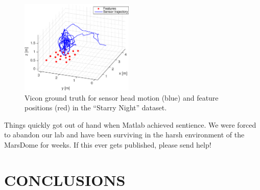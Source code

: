 \documentclass[letterpaper, 10 pt, conference]{ieeeconf}  %
\begin{document}
\begin{figure}
    \centering
    \includegraphics[width=0.48\textwidth]{figs/trajectory_groundtruth}
    \caption{Vicon ground truth for sensor head motion (blue) and feature positions (red) in the ``Starry Night'' dataset.}
    \label{fig:trajectory_groundtruth}
\end{figure}

Things quickly got out of hand when Matlab achieved sentience. 
We were forced to abandon our lab and have been surviving in the harsh environment of the MarsDome for weeks.
If this ever gets published, please send help!

\section{CONCLUSIONS} \label{sec:conclusions}


\def\url#1{} %


\end{document}
